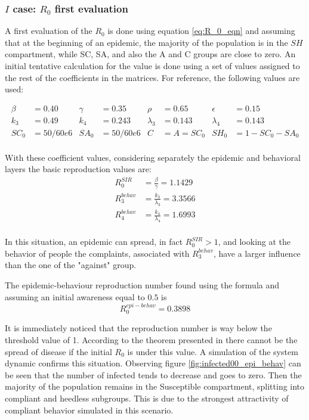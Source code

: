 \subsubsection{$I$ case: $R_0$ first evaluation}

A first evaluation of the $R_0$ is done using equation \ref{eq:R_0_eqn} and assuming that at the beginning of an epidemic, the majority of the population is in the $SH$ compartment, while SC, SA, and also the A and C groups are close to zero. 
An initial tentative calculation for the value is done using a set of values assigned to the rest of the coefficients in the matrices.
For reference, the following values are used:

\begin{align*}
\beta &= 0.40  &\gamma &= 0.35 & \rho &= 0.65 &  \epsilon &= 0.15 \\
k_3 &= 0.49 & k_4 &= 0.243 & \lambda_3 &= 0.143 & \lambda_4 &= 0.143 \\
SC_0 & = 50/60e6 & SA_0 &= 50/60e6 & C &= A = SC_0 & SH_0 & = 1 - SC_0- SA_0\\ 	
\end{align*}


With these coefficient values, considering separately the epidemic and behavioral layers the basic reproduction values are:
 \begin{align*}
 	R_0^{SIR} &= \frac{\beta}{\gamma} = 1.1429 \\
 	R_3^{behav} & = \frac{k_3}{\lambda_3} =  3.3566  \\
 	R_4^{behav} & = \frac{k_4}{\lambda_4} = 1.6993 \\
 \end{align*}
   
In this situation, an epidemic can spread, in fact $R_0^{SIR} >1$, and looking at the behavior of people the complaints, associated with $R_3^{behav}$, have a larger influence than the one of the "against" group.

The epidemic-behaviour reproduction number found using the formula and assuming an initial awareness equal to $0.5$ is 
\[R_0^{epi-behav} = 0.3898\]

It is immediately noticed that the reproduction number is way below the threshold value of 1. According to the theorem presented in \cite{arino2007} there cannot be the spread of disease if the initial $R_0$ is under this value. A simulation of the system dynamic confirms this situation. Observing figure \ref{fig:infected00_epi_behav} can be seen that the number of infected tends to decrease and goes to zero. Then the majority of the population remains in the Susceptible compartment, splitting into compliant and heedless subgroups. This is due to the strongest attractivity of compliant behavior simulated in this scenario.  


